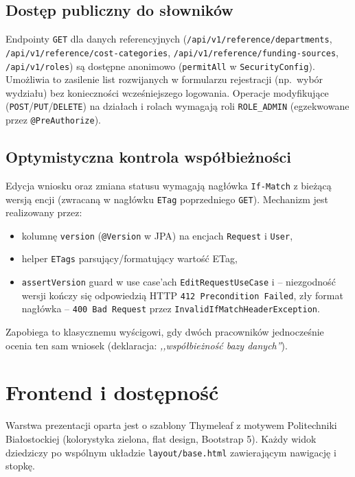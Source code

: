 \documentclass[12pt,a4paper]{article}
\begin{document}
\subsection{Dostęp publiczny do słowników}
Endpointy \texttt{GET} dla danych referencyjnych
(\texttt{/api/v1/reference/departments}, \texttt{/api/v1/reference/cost-categories},
\texttt{/api/v1/reference/funding-sources}, \texttt{/api/v1/roles})
są dostępne anonimowo (\texttt{permitAll} w \texttt{SecurityConfig}).
Umożliwia to zasilenie list rozwijanych w formularzu rejestracji
(np.\ wybór wydziału) bez konieczności wcześniejszego logowania.
Operacje modyfikujące (\texttt{POST}/\texttt{PUT}/\texttt{DELETE}) na działach
i rolach wymagają roli \texttt{ROLE\_ADMIN} (egzekwowane przez \texttt{@PreAuthorize}).

\subsection{Optymistyczna kontrola współbieżności}
Edycja wniosku oraz zmiana statusu wymagają nagłówka
\texttt{If-Match} z bieżącą wersją encji (zwracaną w nagłówku \texttt{ETag}
poprzedniego \texttt{GET}). Mechanizm jest realizowany przez:
\begin{itemize}[leftmargin=*]
  \item kolumnę \texttt{version} (\texttt{@Version} w JPA) na encjach
        \texttt{Request} i \texttt{User},
  \item helper \texttt{ETags} parsujący/formatujący wartość ETag,
  \item \texttt{assertVersion} guard w use case'ach \texttt{EditRequestUseCase}
        i \texttt{} -- niezgodność wersji kończy
        się odpowiedzią HTTP \texttt{412 Precondition Failed}, zły format
        nagłówka -- \texttt{400 Bad Request} przez
        \texttt{InvalidIfMatchHeaderException}.
\end{itemize}
Zapobiega to klasycznemu wyścigowi, gdy dwóch pracowników jednocześnie ocenia
ten sam wniosek (deklaracja: \emph{,,współbieżność bazy danych''}).

\section{Frontend i dostępność}
\label{sec:front}

Warstwa prezentacji oparta jest o szablony Thymeleaf z motywem Politechniki
Białostockiej (kolorystyka zielona, flat design, Bootstrap 5). Każdy widok
dziedziczy po wspólnym układzie \texttt{layout/base.html} zawierającym nawigację
i stopkę.
\end{document}
